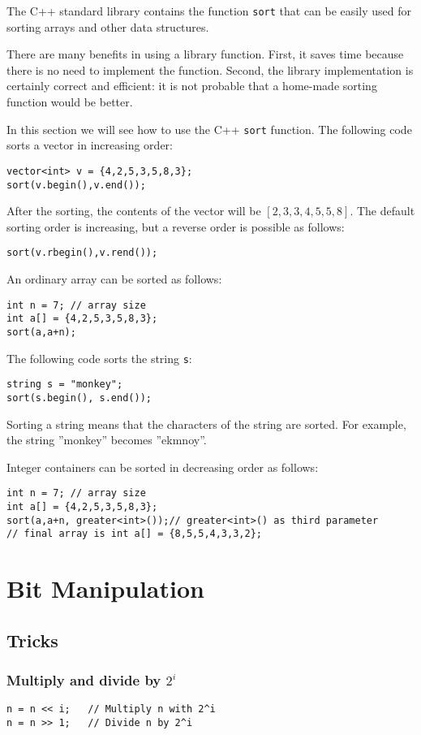 \documentclass[twoside,12pt,a4paper,english]{book}
\theoremstyle{definition}
\theoremstyle{problemstyle}
\begin{document}
The C++ standard library contains
the function \texttt{sort} that can be easily used for
sorting arrays and other data structures.

There are many benefits in using a library function.
First, it saves time because there is no need to
implement the function.
Second, the library implementation is
certainly correct and efficient: it is not probable
that a home-made sorting function would be better.

In this section we will see how to use the
C++ \texttt{sort} function.
The following code sorts
a vector in increasing order:
\begin{lstlisting}
vector<int> v = {4,2,5,3,5,8,3};
sort(v.begin(),v.end());
\end{lstlisting}
After the sorting, the contents of the
vector will be
$[2,3,3,4,5,5,8]$.
The default sorting order is increasing,
but a reverse order is possible as follows:
\begin{lstlisting}
sort(v.rbegin(),v.rend());
\end{lstlisting}
An ordinary array can be sorted as follows:
\begin{lstlisting}
int n = 7; // array size
int a[] = {4,2,5,3,5,8,3};
sort(a,a+n);
\end{lstlisting}
The following code sorts the string \texttt{s}:
\begin{lstlisting}
string s = "monkey";
sort(s.begin(), s.end());
\end{lstlisting}
Sorting a string means that the characters
of the string are sorted.
For example, the string ''monkey'' becomes ''ekmnoy''.

Integer containers can be sorted in decreasing order as follows:

\begin{lstlisting}
int n = 7; // array size
int a[] = {4,2,5,3,5,8,3};
sort(a,a+n, greater<int>());// greater<int>() as third parameter
// final array is int a[] = {8,5,5,4,3,3,2};
\end{lstlisting}


\chapter{Bit Manipulation}
\section{Tricks}
\subsection{Multiply and divide by $2^i$}
\begin{lstlisting}
n = n << i;   // Multiply n with 2^i
n = n >> 1;   // Divide n by 2^i
\end{lstlisting}
\end{document}
